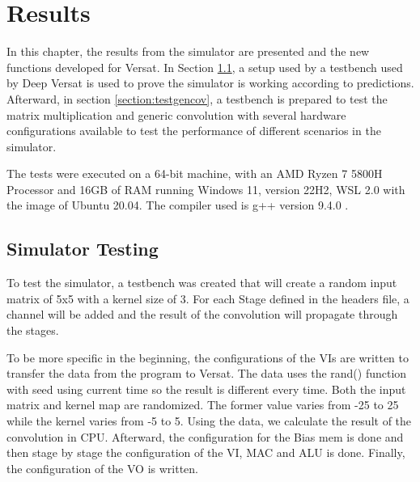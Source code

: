 
\chapter{Results}
\label{chapter:results}

In this chapter, the results from the simulator are presented and the new functions developed
for Versat. In Section \ref{section:simtest}, a setup used by a testbench used by Deep Versat is used
to prove the simulator is working according to predictions. Afterward, in section \ref{section:testgencov}, 
a testbench is prepared to test the matrix multiplication and generic convolution with several hardware configurations
available to test the performance of different scenarios in the simulator.

The tests were executed on a 64-bit machine, with an AMD Ryzen 7 5800H Processor and 16GB of RAM running
Windows 11, version 22H2, WSL 2.0 with the image of Ubuntu 20.04. The compiler used is
g++ version 9.4.0 .

\section{Simulator Testing}
\label{section:simtest}

To test the simulator, a testbench was created that will create a random input matrix of 5x5
with a kernel size of 3. For each Stage defined in the headers file, a channel will be added and
the result of the convolution will propagate through the stages.

To be more specific in the beginning, the configurations of the VIs are written to transfer the data
from the program to Versat. The data uses the rand() function with seed using current time
so the result is different every time. Both the input matrix and kernel map are randomized.
The former value varies from -25 to 25 while the kernel varies from -5 to 5. Using the data, 
we calculate the result of the convolution in CPU. Afterward, the configuration for the Bias mem
is done and then stage by stage the configuration of the VI, MAC and ALU is done. Finally, the
configuration of the VO is written.

